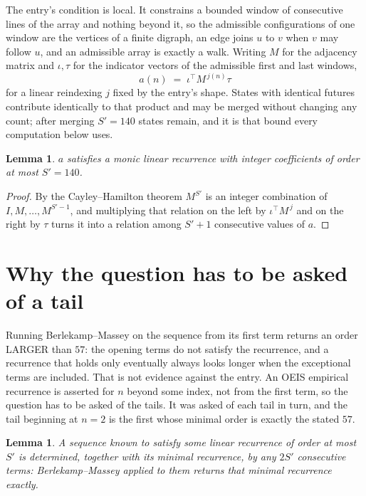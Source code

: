 \documentclass[11pt,a4paper]{article}
\theoremstyle{plain}
\newtheorem{lemma}[theorem]{Lemma}
\theoremstyle{definition}
\begin{document}
The entry's condition is local. It constrains a bounded window of consecutive lines of the
array and nothing beyond it, so the admissible configurations of one window are the vertices of
a finite digraph, an edge joins $u$ to $v$ when $v$ may follow $u$, and an admissible array is
exactly a walk. Writing $M$ for the adjacency matrix and $\iota,\tau$ for the indicator vectors
of the admissible first and last windows,
\[
a(n)\;=\;\iota^{\!\top}M^{\,j(n)}\tau
\]
for a linear reindexing $j$ fixed by the entry's shape. States with identical futures
contribute identically to that product and may be merged without changing any count; after
merging $S'=140$ states remain, and it is that bound every computation below uses.

\begin{lemma}\label{lem:cf}
$a$ satisfies a monic linear recurrence with integer coefficients of order at most $S'=140$.
\end{lemma}

\begin{proof}
By the Cayley--Hamilton theorem $M^{S'}$ is an integer combination of $I,M,\dots,M^{S'-1}$,
and multiplying that relation on the left by $\iota^{\!\top}M^{\,j}$ and on the right by
$\tau$ turns it into a relation among $S'+1$ consecutive values of $a$.
\end{proof}

\section{Why the question has to be asked of a tail}

Running Berlekamp--Massey on the sequence from its first term returns an order LARGER than $57$: the opening terms do not satisfy the recurrence, and a recurrence that holds only eventually always looks longer when the exceptional terms are included. That is not evidence against the entry. An OEIS empirical recurrence is asserted for $n$ beyond some index, not from the first term, so the question has to be asked of the tails. It was asked of each tail in turn, and the tail beginning at $n=2$ is the first whose minimal order is exactly the stated $57$.

\begin{lemma}\label{lem:bm}
A sequence known to satisfy some linear recurrence of order at most $S'$ is determined,
together with its minimal recurrence, by any $2S'$ consecutive terms: Berlekamp--Massey applied
to them returns that minimal recurrence exactly.
\end{lemma}
\end{document}
